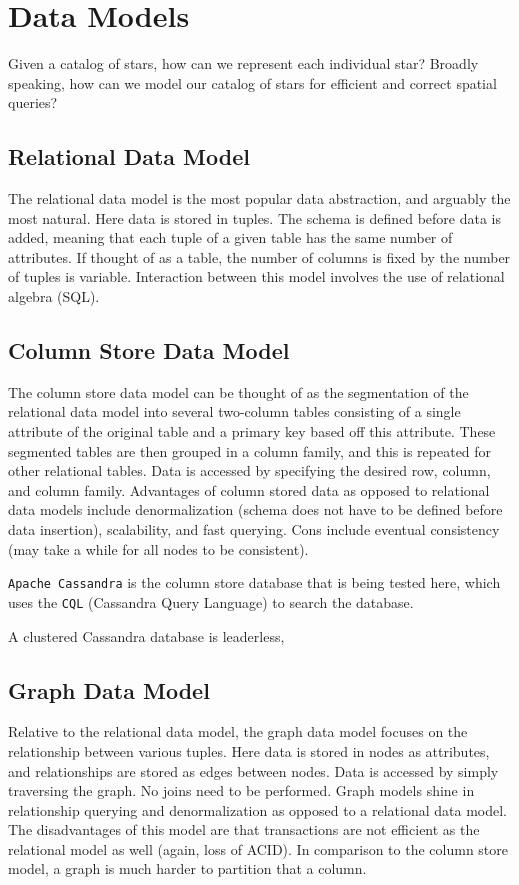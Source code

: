 \section{Data Models}\label{sec:dataModels}
Given a catalog of stars, how can we represent each individual star?
Broadly speaking, how can we model our catalog of stars for efficient and correct spatial queries?



\subsection{Relational Data Model}\label{subsec:relationalDataModel}
The relational data model is the most popular data abstraction, and arguably the most natural.
Here data is stored in tuples.
The schema is defined before data is added, meaning that each tuple of a given table has the same number of attributes.
If thought of as a table, the number of columns is fixed by the number of tuples is variable.
Interaction between this model involves the use of relational algebra (SQL).

\subsection{Column Store Data Model}\label{subsec:key-valueDataModel}
The column store data model can be thought of as the segmentation of the relational data model into several
two-column tables consisting of a single attribute of the original table and a primary key based off this attribute.
These segmented tables are then grouped in a column family, and this is repeated for other relational tables.
Data is accessed by specifying the desired row, column, and column family.
Advantages of column stored data as opposed to relational data models include denormalization (schema does not have to
be defined before data insertion), scalability, and fast querying.
Cons include eventual consistency (may take a while for all nodes to be consistent).

\texttt{Apache Cassandra} is the column store database that is being tested here, which uses the \texttt{CQL}
(Cassandra Query Language) to search the database.

A clustered Cassandra database is leaderless,


\subsection{Graph Data Model}\label{subsec:graphDataModel}
Relative to the relational data model, the graph data model focuses on the relationship between various tuples.
Here data is stored in nodes as attributes, and relationships are stored as edges between nodes.
Data is accessed by simply traversing the graph.
No joins need to be performed.
Graph models shine in relationship querying and denormalization as opposed to a relational data model.
The disadvantages of this model are that transactions are not efficient as the relational model as well (again, loss
of ACID).
In comparison to the column store model, a graph is much harder to partition that a column.


